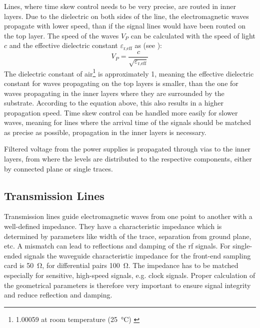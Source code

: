 Lines, where time skew control needs to be very precise, are routed in inner layers. 
Due to the dielectric on both sides of the line, the electromagnetic waves propagate with lower speed, than if the signal lines would have been routed on the top layer.
The speed of the waves $V_P$ can be calculated with the speed of light $c$ and the effective dielectric constant $\varepsilon_\text{r,eff}$ as (see \cite{thierauf}):
\begin{equation}
	V_P = \frac{c}{\sqrt{\varepsilon_\text{r,eff}}}
\end{equation}
The dielectric constant of air\footnote{1.00059 at room temperature (\SI{25}{\degreeCelsius}) \cite{dielectric}} is approximately 1, meaning the effective dielectric constant for waves propagating on the top layers is smaller, than the one for waves propagating in the inner layers where they are surrounded by the substrate.
According to the equation above, this also results in a higher propagation speed. 
Time skew control can be handled more easily for slower waves, meaning for lines where the arrival time of the signals should be matched as precise as possible, propagation in the inner layers is necessary.

Filtered voltage from the power supplies is propagated through vias to the inner layers, from where the levels are distributed to the respective components, either by connected plane or single traces.

\subsection{Transmission Lines}
Transmission lines guide electromagnetic waves from one point to another with a well-defined impedance. 
They have a characteristic impedance which is determined by parameters like width of the trace, separation from ground plane, etc.  
A mismatch can lead to reflections and damping of the \gls{rf} signals.
For single-ended signals the waveguide characteristic impedance for the front-end sampling card is \SI{50}{\ohm}, for differential pairs \SI{100}{\ohm}.
The impedance has to be matched especially for sensitive, high-speed signals, e.g. clock signals. 
Proper calculation of the geometrical parameters is therefore very important to ensure signal integrity and reduce reflection and damping. 

